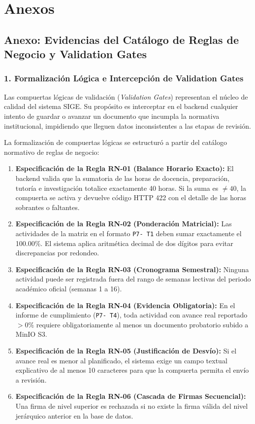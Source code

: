 \documentclass[12pt,a4paper]{article}
\begin{document}
\vspace{0.4cm}

\section{Anexos}

\subsection*{Anexo: Evidencias del Catálogo de Reglas de Negocio y Validation Gates}

\subsubsection*{1. Formalización Lógica e Intercepción de Validation Gates}
Las compuertas lógicas de validación (\textit{Validation Gates}) representan el núcleo de calidad del sistema SIGE. Su propósito es interceptar en el backend cualquier intento de guardar o avanzar un documento que incumpla la normativa institucional, impidiendo que lleguen datos inconsistentes a las etapas de revisión.

La formalización de compuertas lógicas se estructuró a partir del catálogo normativo de reglas de negocio:
\begin{enumerate}[leftmargin=1.5em, itemsep=2pt]
    \item \textbf{Especificación de la Regla RN-01 (Balance Horario Exacto):} El backend valida que la sumatoria de las horas de docencia, preparación, tutoría e investigación totalice exactamente 40 horas. Si la suma es $\ne 40$, la compuerta se activa y devuelve código HTTP 422 con el detalle de las horas sobrantes o faltantes.
    \item \textbf{Especificación de la Regla RN-02 (Ponderación Matricial):} Las actividades de la matriz en el formato \texttt{P7- T1} deben sumar exactamente el 100.00\%. El sistema aplica aritmética decimal de dos dígitos para evitar discrepancias por redondeo.
    \item \textbf{Especificación de la Regla RN-03 (Cronograma Semestral):} Ninguna actividad puede ser registrada fuera del rango de semanas lectivas del periodo académico oficial (semanas 1 a 16).
    \item \textbf{Especificación de la Regla RN-04 (Evidencia Obligatoria):} En el informe de cumplimiento (\texttt{P7- T4}), toda actividad con avance real reportado $> 0\%$ requiere obligatoriamente al menos un documento probatorio subido a MinIO S3.
    \item \textbf{Especificación de la Regla RN-05 (Justificación de Desvío):} Si el avance real es menor al planificado, el sistema exige un campo textual explicativo de al menos 10 caracteres para que la compuerta permita el envío a revisión.
    \item \textbf{Especificación de la Regla RN-06 (Cascada de Firmas Secuencial):} Una firma de nivel superior es rechazada si no existe la firma válida del nivel jerárquico anterior en la base de datos.
\end{enumerate}
\end{document}
